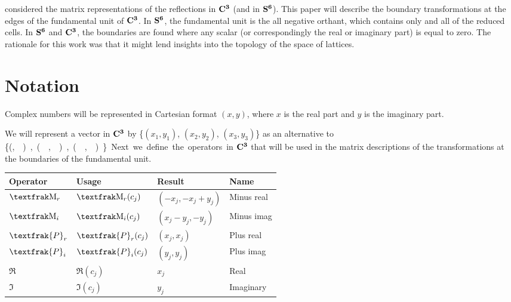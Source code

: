 \documentclass[]{iucr}              %
\numberwithin{equation}{section}
\newcommand{\SVI}[0]{$\bf{S^{6}}$}
\newcommand{\CIII}[0]{$\bf{C^{3}}$}
\begin{document}
		 considered the matrix representations of the reflections in \CIII{} (and in \SVI{}). This paper will describe the boundary transformations at the edges of the fundamental
	unit of \CIII{}. In \SVI{}, the fundamental unit is the all negative orthant, which contains only and
	all of the reduced cells. In \SVI{} and \CIII{}, the boundaries are found where any scalar (or correspondingly the real 
	or imaginary part) is equal to zero. The rationale for this work was that it might lend insights into the
	topology of the space of lattices. 
	
	
		
	
	\section{Notation}
	
	Complex numbers will be represented in Cartesian format $(x,y)$, where $x$ is the real part and
	$y$ is the imaginary part.
	
	We will represent a vector in \CIII{} by \{$(x_1,y_1)$, $(x_2,y_2)$, $(x_3, y_3)$\} as an alternative to  \{(\si,\siv ), (\sii,\sv),(\sii,\svi)\}.
	
	Next we define the operators in \CIII{} that will be used in the matrix descriptions of 
	the transformations at the boundaries of the fundamental unit.\\
	
	\begin{table}	
		\begin{tabular}{|l|l|l|l|}
			\hline
			Operator&Usage&Result&Name \\ \hline
			$\Minus{}_r $&  $\Minus{}_r(c_j)$ & $(-x_j, -x_j+y_j)$ & Minus real \\ \hline
			$\Minus{}_i $ & $\Minus{}_i(c_j)$ & $(x_j-y_j,-y_j) $ & Minus imag\\ \hline
			$\textfrak{P}_r$ & $ \textfrak{P}_r(c_j)$ & $(x_j, x_j)$ & Plus real\\ \hline
			$\textfrak{P}_i$ &  $\textfrak{P}_i(c_j)$  & $(y_j, y_j)$ & Plus imag\\ \hline
			$\Re$ &  $\Re(c_j)$ & $x_j$ & Real \\ \hline
			$\Im$  &$ \Im(c_j)$ & $y_j$ & Imaginary \\ \hline
			
			
			
		\end{tabular}		
		
	\end{table}
\end{document}
